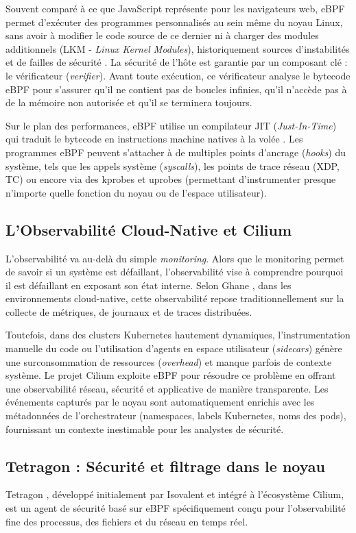 \documentclass[a4paper,12pt]{article}
\begin{document}
Souvent comparé à ce que JavaScript représente pour les navigateurs web, eBPF permet d'exécuter des programmes personnalisés au sein même du noyau Linux, sans avoir à modifier le code source de ce dernier ni à charger des modules additionnels (LKM - \textit{Linux Kernel Modules}), historiquement sources d'instabilités et de failles de sécurité \cite{vieira2020fast}. La sécurité de l'hôte est garantie par un composant clé : le vérificateur (\textit{verifier}). Avant toute exécution, ce vérificateur analyse le bytecode eBPF pour s'assurer qu'il ne contient pas de boucles infinies, qu'il n'accède pas à de la mémoire non autorisée et qu'il se terminera toujours.

Sur le plan des performances, eBPF utilise un compilateur JIT (\textit{Just-In-Time}) qui traduit le bytecode en instructions machine natives à la volée \cite{scholz2018performance}. Les programmes eBPF peuvent s'attacher à de multiples points d'ancrage (\textit{hooks}) du système, tels que les appels système (\textit{syscalls}), les points de trace réseau (XDP, TC) ou encore via des kprobes et uprobes (permettant d'instrumenter presque n'importe quelle fonction du noyau ou de l'espace utilisateur).

\subsection{L'Observabilité Cloud-Native et Cilium}
L'observabilité va au-delà du simple \textit{monitoring}. Alors que le monitoring permet de savoir si un système est défaillant, l'observabilité vise à comprendre pourquoi il est défaillant en exposant son état interne. Selon Ghane \cite{ghane2025observability}, dans les environnements cloud-native, cette observabilité repose traditionnellement sur la collecte de métriques, de journaux et de traces distribuées.

Toutefois, dans des clusters Kubernetes hautement dynamiques, l'instrumentation manuelle du code ou l'utilisation d'agents en espace utilisateur (\textit{sidecars}) génère une surconsommation de ressources (\textit{overhead}) et manque parfois de contexte système. Le projet Cilium exploite eBPF pour résoudre ce problème en offrant une observabilité réseau, sécurité et applicative de manière transparente. Les événements capturés par le noyau sont automatiquement enrichis avec les métadonnées de l'orchestrateur (namespaces, labels Kubernetes, noms des pods), fournissant un contexte inestimable pour les analystes de sécurité.

\subsection{Tetragon : Sécurité et filtrage dans le noyau}
Tetragon \cite{tetragon_web}, développé initialement par Isovalent et intégré à l'écosystème Cilium, est un agent de sécurité basé sur eBPF spécifiquement conçu pour l'observabilité fine des processus, des fichiers et du réseau en temps réel.
\end{document}
